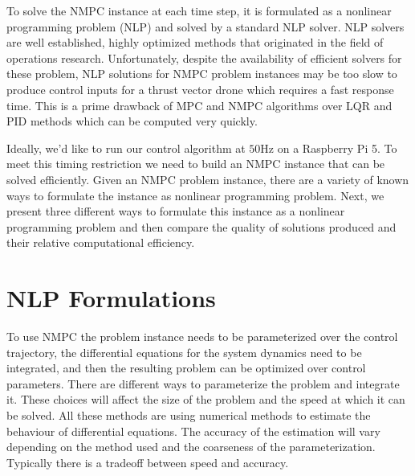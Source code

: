 \documentclass[]{article}
\newcommand{\mpc}{MPC}
\newcommand{\nmpc}{NMPC}
\begin{document}
To solve the {\nmpc} instance at each time step, it is formulated as a nonlinear programming problem (NLP) and solved by a standard NLP solver.  NLP solvers are well established, highly optimized methods that originated in the field of operations research. Unfortunately, despite the availability of efficient solvers for these problem, NLP solutions for {\nmpc} problem instances may be too slow to produce control inputs for a thrust vector drone which requires a fast response time. This is a prime drawback of {\mpc} and {\nmpc} algorithms over LQR and PID  methods which can be computed very quickly.

Ideally, we'd like to run our control algorithm at $50$Hz on a Raspberry Pi 5.  To meet this timing restriction we need to build an {\nmpc} instance that can be solved efficiently. Given an {\nmpc} problem instance, there are a variety of known ways to formulate the instance as nonlinear programming problem.  
Next, we present three different ways to formulate this instance as a nonlinear programming problem and then compare the quality of  solutions produced and their relative computational efficiency.


\section*{NLP Formulations}

To use {\nmpc} the problem instance needs to be parameterized over the control trajectory, the differential equations for the system dynamics need to be integrated, and then the resulting problem can be optimized over control parameters. There are different ways to parameterize the problem and integrate it.  These choices will affect the size of the problem and the speed at which it can be solved. All these methods are using numerical methods to estimate the behaviour of differential equations. The accuracy of the estimation will vary depending on the method used and the coarseness of the parameterization. Typically there is a tradeoff between speed and accuracy.
\end{document}
